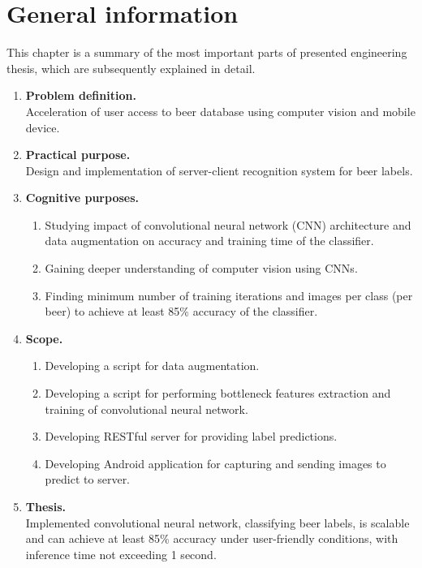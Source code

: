 \documentclass[11pt]{article}
\begin{document}
\thispagestyle{empty}
\tableofcontents
\clearpage
\setcounter{page}{1}

\section{General information} \label{general}
This chapter is a summary of the most important parts of presented engineering thesis, which are subsequently explained in detail.\\

\begin{enumerate}
\item \textbf{Problem definition.}\\
Acceleration of user access to beer database using computer vision and mobile device.

\item \textbf{Practical purpose.}\\
Design and implementation of server-client recognition system for beer labels.

\item \textbf{Cognitive purposes.}
	\begin{enumerate}
	\item Studying impact of convolutional neural network (CNN) architecture and data augmentation on accuracy and training time of the classifier.
	\item Gaining deeper understanding of computer vision using CNNs.
	\item Finding minimum number of training iterations and images per class (per beer) to achieve at least 85\% accuracy of the classifier.
	\end{enumerate}

\item \textbf{Scope.}
	\begin{enumerate}
	\item Developing a script for data augmentation.
	\item Developing a script for performing bottleneck features extraction and training of convolutional neural network.
	\item Developing RESTful server for providing label predictions.
	\item Developing Android application for capturing and sending images to predict to server.
	\end{enumerate}

\item \textbf{Thesis.}\\
Implemented convolutional neural network, classifying beer labels, is scalable and can achieve at least 85\% accuracy under user-friendly conditions, with inference time not exceeding 1 second.
\end{enumerate}
\clearpage
\end{document}
